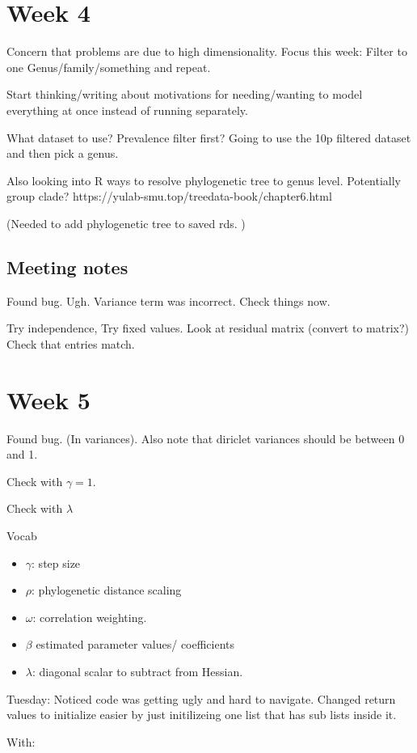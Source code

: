 \documentclass[10pt]{article}
\theoremstyle{definition}
\begin{document}
\section{Week 4}

Concern that problems are due to high dimensionality. Focus this week: Filter to one Genus/family/something and repeat.

Start thinking/writing about motivations for needing/wanting to model everything at once instead of running separately.

What dataset to use? Prevalence filter first?
Going to use the 10p filtered dataset and then pick a genus.

Also looking into R ways to resolve phylogenetic tree to genus level.
Potentially group clade? https://yulab-smu.top/treedata-book/chapter6.html

(Needed to add phylogenetic tree to saved rds. )


\subsection{Meeting notes}

Found bug. Ugh. Variance term was incorrect. Check things now.


Try independence,
Try fixed values.
Look at residual matrix (convert to matrix?)
Check that entries match.




\section{Week 5}

Found bug. (In variances). Also note that diriclet variances should be between 0 and 1.

Check with $\gamma = 1$.


Check with $\lambda$


Vocab
\begin{itemize}
  \item $\gamma$: step size
  \item $\rho$: phylogenetic distance scaling
  \item $\omega$: correlation weighting.
  \item $\beta$ estimated parameter values/ coefficients
  \item $\lambda$: diagonal scalar to subtract from Hessian.
\end{itemize}


Tuesday:
Noticed code was getting ugly and hard to navigate. Changed return values to initialize easier by just initilizeing one list that has sub lists inside it.

With:
\end{document}
